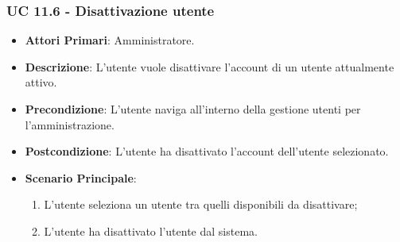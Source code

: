 			
			\subsubsection{UC 11.6 - Disattivazione utente}
			\begin{itemize}
				\item \textbf{Attori Primari}: Amministratore.
				\item \textbf{Descrizione}: L'utente vuole disattivare l'account di un utente attualmente attivo.
				\item \textbf{Precondizione}: L'utente naviga all'interno della gestione utenti per l'amministrazione.
				\item \textbf{Postcondizione}: L'utente ha disattivato l'account dell'utente selezionato.
				\item \textbf{Scenario Principale}:
				\begin{enumerate}
					\item{L'utente seleziona un utente tra quelli disponibili da disattivare;}
					\item{L'utente ha disattivato l'utente dal sistema.}
				\end{enumerate}		
			\end{itemize}

			
			